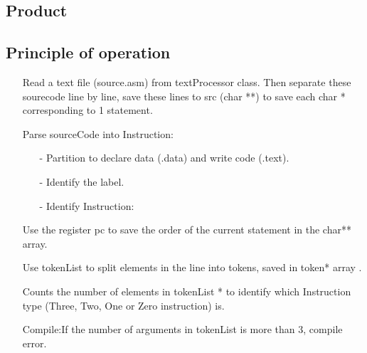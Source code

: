 \documentclass[10pt]{article}
\begin{document}
\begin{large}
\section{Product}\label{product}
    \subsection{Principle of operation}
        \begin{itemize}
            \item[]
                Read a text file (source.asm) from textProcessor class. Then separate these sourecode line by line, save these lines to src (char **) to save each char * corresponding to 1 statement.
            \item[]
                Parse sourceCode into Instruction:
                \begin{itemize}
                    \item[-]
                        Partition to declare data (.data) and write code (.text).
                    \item[-]
                        Identify the label.
                    \item[-]
                        Identify Instruction:
                \end{itemize}
            \item[]
                Use the register pc to save the order of the current statement in the char** array.
            \item[]
                Use tokenList to split elements in the line into tokens, saved in token* array .
            \item[]
                Counts the number of elements in tokenList * to identify which Instruction type (Three, Two, One or Zero instruction) is.
            \item[]
                Compile:If the number of arguments in tokenList is more than 3, compile error.
            

\end{itemize}
\end{large}
\end{document}

